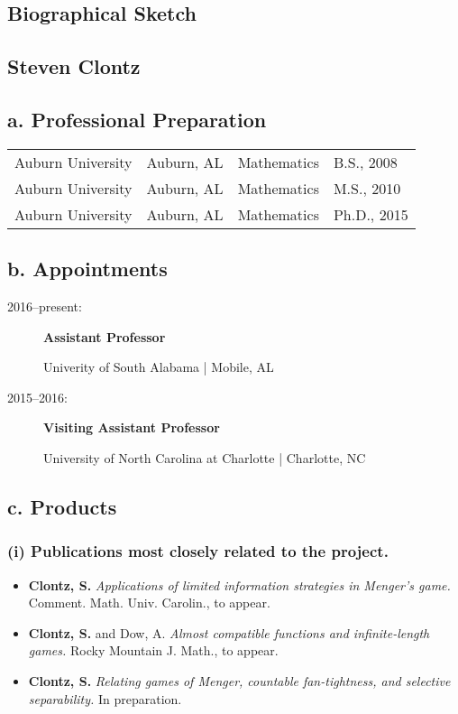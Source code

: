 \documentclass{article}
\begin{document}
\begin{center}
\section*{Biographical Sketch}

\subsection*{Steven Clontz}
\end{center}

\subsection*{a. Professional Preparation}

 \begin{tabular}{llll}
   Auburn University &
      Auburn, AL &
      Mathematics &
      B.S., 2008
      \\
   Auburn University &
      Auburn, AL &
      Mathematics &
      M.S., 2010
      \\
   Auburn University &
      Auburn, AL &
      Mathematics &
      Ph.D., 2015
      \\
 \end{tabular}

\subsection*{b. Appointments}

\begin{description}
  \item[2016--present:] \textbf{Assistant Professor}

  Univerity of South Alabama | Mobile, AL

  \item[2015--2016:] \textbf{Visiting Assistant Professor}

  University of North Carolina at Charlotte | Charlotte, NC
\end{description}



\subsection*{c. Products}


\subsubsection*{(i) Publications most closely related to the project.}
\begin{itemize}
  \item \textbf{Clontz, S.}
    \textit{Applications of limited information strategies in Menger's game.}
    Comment. Math. Univ. Carolin., to appear.
  \item \textbf{Clontz, S.} and Dow, A.
    \textit{Almost compatible functions and infinite-length games.}
    Rocky Mountain J. Math., to appear.
  \item \textbf{Clontz, S.}
    \textit{Relating games of Menger, countable fan-tightness, and selective separability.}
    In preparation.
\end{itemize}
\end{document}
